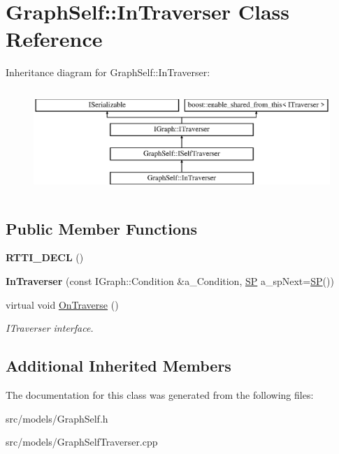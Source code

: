 \hypertarget{class_graph_self_1_1_in_traverser}{}\section{Graph\+Self\+:\+:In\+Traverser Class Reference}
\label{class_graph_self_1_1_in_traverser}
Inheritance diagram for Graph\+Self\+:\+:In\+Traverser\+:\begin{figure}[H]
\begin{center}
\leavevmode
\includegraphics[height=3.985765cm]{class_graph_self_1_1_in_traverser}
\end{center}
\end{figure}
\subsection*{Public Member Functions}
\begin{DoxyCompactItemize}
\item 
\mbox{\label{class_graph_self_1_1_in_traverser_a9201fa64b5d51c7eb966aa312aef6002}} 
{\bfseries R\+T\+T\+I\+\_\+\+D\+E\+CL} ()
\item 
\mbox{\label{class_graph_self_1_1_in_traverser_a5ff5058fff7c208487e20cb9fe364b1f}} 
{\bfseries In\+Traverser} (const I\+Graph\+::\+Condition \&a\+\_\+\+Condition, \hyperlink{class_i_graph_1_1_i_traverser_a5a5ccc81423d6024742d1898a310d812}{SP} a\+\_\+sp\+Next=\hyperlink{class_i_graph_1_1_i_traverser_a5a5ccc81423d6024742d1898a310d812}{SP}())
\item 
\mbox{\label{class_graph_self_1_1_in_traverser_a278bb28277a756637900c48bc3795d44}} 
virtual void \hyperlink{class_graph_self_1_1_in_traverser_a278bb28277a756637900c48bc3795d44}{On\+Traverse} ()
\begin{DoxyCompactList}\small\item\em I\+Traverser interface. \end{DoxyCompactList}\end{DoxyCompactItemize}
\subsection*{Additional Inherited Members}


The documentation for this class was generated from the following files\+:\begin{DoxyCompactItemize}
\item 
src/models/Graph\+Self.\+h\item 
src/models/Graph\+Self\+Traverser.\+cpp\end{DoxyCompactItemize}
